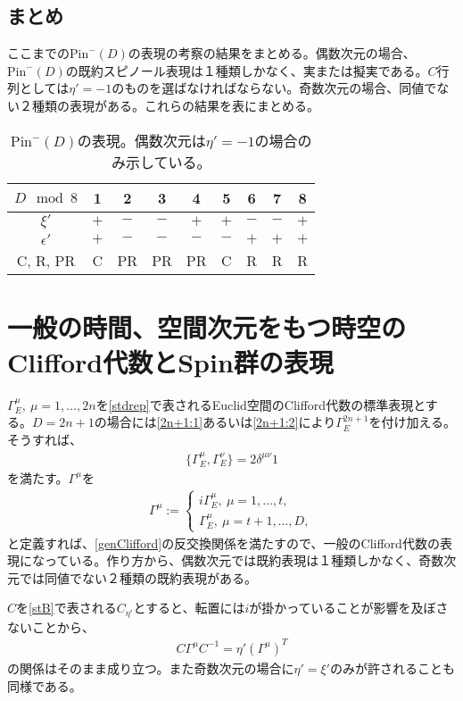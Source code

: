 \documentclass[12pt,a4paper]{jlreq}
\newcommand{\Pim}{\mathrm{Pin}^{-}}
\begin{document}
\subsection{まとめ}
ここまでの$\Pim(D)$の表現の考察の結果をまとめる。偶数次元の場合、$\Pim(D)$の既約スピノール表現は１種類しかなく、実または擬実である。$C$行列としては$\eta'=-1$のものを選ばなければならない。奇数次元の場合、同値でない２種類の表現がある。これらの結果を表にまとめる。
\begin{table}[htb]
  \begin{center}
    \begin{tabular}{|c|c|c|c|c|c|c|c|c|}\hline
      $D \mod 8$ & 1 & 2 & 3 & 4 & 5 & 6 & 7 & 8\\ \hline
      $\xi'$ & $+$ & $-$ & $-$ & $+$ & $+$ & $-$ & $-$ & $+$ \\\hline
      $\epsilon'$ & $+$ & $-$ & $-$ & $-$ & $-$ & $+$ & $+$ & $+$ \\ \hline
      C, R, PR & C & PR & PR & PR & C & R & R & R \\ \hline
    \end{tabular}
  \end{center} 
  \caption{$\Pim(D)$の表現。偶数次元は$\eta'=-1$の場合のみ示している。}
  \end{table}
    
\section{一般の時間、空間次元をもつ時空のClifford代数とSpin群の表現}
$\Gamma_{E}^{\mu},\ \mu=1,\dots,2n$を\eqref{stdrep}で表されるEuclid空間のClifford代数の標準表現とする。$D=2n+1$の場合には\eqref{2n+1:1}あるいは\eqref{2n+1:2}により$\Gamma_{E}^{2n+1}$を付け加える。そうすれば、
\begin{align*}
  \{\Gamma_{E}^{\mu},\Gamma_{E}^{\nu}\}=2\delta^{\mu\nu}1
\end{align*}
を満たす。$\Gamma^{\mu}$を
\begin{align}
  \Gamma^{\mu}:=
  \begin{cases}
    i\Gamma^{\mu}_{E},\ \mu=1,\dots,t,\\
    \Gamma^{\mu}_{E},\ \mu=t+1,\dots,D,
  \end{cases}
\end{align}
と定義すれば、\eqref{genClifford}の反交換関係を満たすので、一般のClifford代数の表現になっている。作り方から、偶数次元では既約表現は１種類しかなく、奇数次元では同値でない２種類の既約表現がある。

$C$を\eqref{stB}で表される$C_{\eta'}$とすると、転置には$i$が掛かっていることが影響を及ぼさないことから、
\begin{align*}
  C\Gamma^{\mu}C^{-1}=\eta'(\Gamma^{\mu})^T
\end{align*}
の関係はそのまま成り立つ。また奇数次元の場合に$\eta'=\xi'$のみが許されることも同様である。
\end{document}
